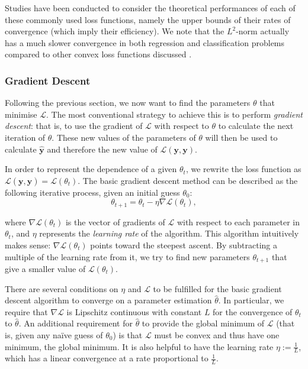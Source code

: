 \documentclass[a4paper,11pt,titlepage]{article}
\theoremstyle{definition}
\theoremstyle{plain}
\theoremstyle{remark}
\begin{document}
Studies have been conducted to consider the theoretical performances of each of these commonly used loss functions, namely the upper bounds of their rates of convergence (which imply their efficiency). We note that the $L^2$-norm actually has a much slower convergence in both regression and classification problems compared to other convex loss functions discussed \cite{Rosasco2004}.

\subsubsection{Gradient Descent}
\label{sec:gd}

Following the previous section, we now want to find the parameters $\theta$ that minimise $\mathcal{L}$. The most conventional strategy to achieve this is to perform \textit{gradient descent}: that is, to use the gradient of $\mathcal{L}$ with respect to $\theta$ to calculate the next iteration of $\theta$. These new values of the parameters of $\theta$ will then be used to calculate $\mathbf{\hat{y}}$ and therefore the new value of $\mathcal{L}(\mathbf{y}, \mathbf{y})$. 

In order to represent the dependence of a given $\theta_t$, we rewrite the loss function as $\mathcal{L}(\mathbf{y},\mathbf{\hat{y}}) = \mathcal{L}(\theta_t)$. The basic gradient descent method can be described as the following iterative process, given an initial guess $\theta_0$:
$$\theta_{t+1} = \theta_t - \eta \nabla\mathcal{L}(\theta_t),$$

where $\nabla\mathcal{L}(\theta_t)$ is the vector of gradients of $\mathcal{L}$ with respect to each parameter in $\theta_t$, and $\eta$ represents the \textit{learning rate} of the algorithm. This algorithm intuitively makes sense: $\nabla\mathcal{L}(\theta_t)$ points toward the steepest ascent. By subtracting a multiple of the learning rate from it, we try to find new parameters $\theta_{t+1}$ that give a smaller value of $\mathcal{L}(\theta_t)$. \cite{nazarathy2021}

There are several conditions on $\eta$ and $\mathcal{L}$ to be fulfilled for the basic gradient descent algorithm to converge on a parameter estimation $\hat{\theta}$. In particular, we require that $\nabla\mathcal{L}$ is Lipschitz continuous with constant $L$ for the convergence of $\theta_t$ to $\hat{\theta}$. An additional requirement for $\hat{\theta}$ to provide the global minimum of $\mathcal{L}$ (that is, given any naïve guess of $\theta_0$) is that $\mathcal{L}$ must be convex and thus have one minimum, the global minimum. It is also helpful to have the learning rate $\eta := \frac{1}{L}$, which has a linear convergence at a rate proportional to $\frac{1}{L}$. \cite{gower2015}
\end{document}
